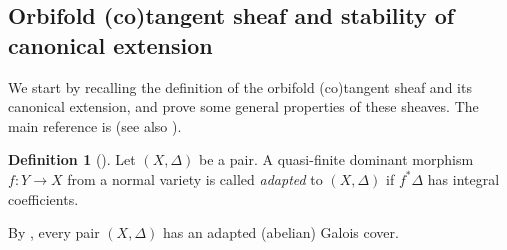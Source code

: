 \documentclass[12pt]{amsart}
\newtheorem{lem}[prop]{Lemma}
\theoremstyle{definition}
\newtheorem{defn}[prop]{Definition}
\newcommand{\bQ}{\mathbb{Q}}
\newcommand{\cY}{\mathcal{Y}}
\newcommand{\cE}{\mathcal{E}}
\newcommand{\mult}{\mathrm{mult}}
\numberwithin{equation}{section}
\begin{document}


\subsection{Orbifold (co)tangent sheaf and stability of canonical extension}

We start by recalling the definition of the orbifold (co)tangent sheaf and its canonical extension, and prove some general properties of these sheaves. The main reference is \cite{CKT-hyperbolicity} (see also \cites{GT-orbifold-stab,Li-extension-stab,Dai-MY,Dai-stability}).


\begin{defn}[{\cite[Definition 2.37]{CKT-hyperbolicity}}]
Let $(X,\Delta)$ be a pair. A quasi-finite dominant morphism $f\colon Y \to X$ from a normal variety is called \emph{adapted} to $(X,\Delta)$ if $f^*\Delta$ has integral coefficients.
\end{defn}

By \cite[Proposition 2.38]{CKT-hyperbolicity}, every pair $(X,\Delta)$ has an adapted (abelian) Galois cover. %

\end{document}
